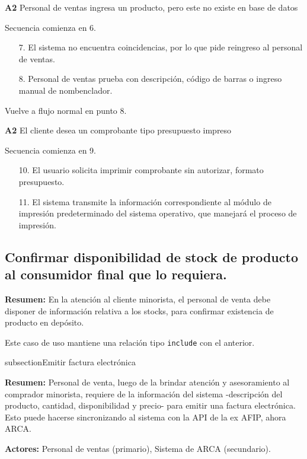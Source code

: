 \textbf{A2} Personal de ventas ingresa un producto, pero este no existe en base de datos

Secuencia comienza en 6.

\begin{enumerate}
	\item[7.] El sistema no encuentra coincidencias, por lo que pide reingreso al personal de ventas.
	\item[8.] Personal de ventas prueba con descripción, código de barras o ingreso manual de nombenclador.
\end{enumerate}

Vuelve a flujo normal en punto 8.

\textbf{A2} El cliente desea un comprobante tipo presupuesto impreso

Secuencia comienza en 9.

\begin{enumerate}
	\item[10.] El usuario solicita imprimir comprobante sin autorizar, formato presupuesto.
	\item[11.] El sistema transmite la información correspondiente al módulo de impresión predeterminado del sistema operativo,
	que manejará el proceso de impresión.
\end{enumerate}

\pagebreak

\subsection{Confirmar disponibilidad de stock de producto al consumidor final que lo requiera.}

\textbf{Resumen:}
En la atención al cliente minorista,
el personal de venta debe disponer de información relativa a los stocks,
para confirmar existencia de producto en depósito.

Este caso de uso mantiene una relación tipo \texttt{include} con el anterior.

\pagebreak

subsection{Emitir factura electrónica}

\textbf{Resumen:}
Personal de venta, 
luego de la brindar atención y asesoramiento al comprador minorista,
requiere de la información del sistema
-descripción del producto, cantidad, disponibilidad y precio-
para emitir una factura electrónica.
Esto puede hacerse sincronizando al sistema con la API de la ex AFIP,
ahora ARCA.

\textbf{Actores:} Personal de ventas (primario), Sistema de ARCA (secundario).

